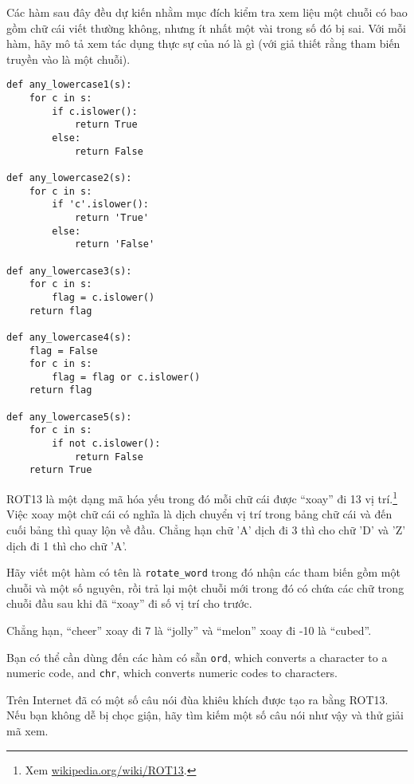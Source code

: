 \documentclass[11pt]{book}
\begin{document}
\begin{ex}
Các hàm sau đây đều dự kiến nhằm mục đích kiểm tra xem liệu một chuỗi
có bao gồm chữ cái viết thường không, nhưng ít nhất một vài trong số đó
bị sai. Với mỗi hàm, hãy mô tả xem tác dụng thực sự của nó là gì (với
giả thiết rằng tham biến truyền vào là một chuỗi).

\beforeverb
\begin{verbatim}
def any_lowercase1(s):
    for c in s:
        if c.islower():
            return True
        else:
            return False

def any_lowercase2(s):
    for c in s:
        if 'c'.islower():
            return 'True'
        else:
            return 'False'

def any_lowercase3(s):
    for c in s:
        flag = c.islower()
    return flag

def any_lowercase4(s):
    flag = False
    for c in s:
        flag = flag or c.islower()
    return flag

def any_lowercase5(s):
    for c in s:
        if not c.islower():
            return False
    return True
\end{verbatim}
\afterverb

\end{ex}


\begin{ex}

\label{exrotate}
ROT13 là một dạng mã hóa yếu trong đó mỗi chữ cái được ``xoay'' đi
13 vị trí.\footnote{Xem
  \url{wikipedia.org/wiki/ROT13}.} Việc xoay một chữ cái có nghĩa
là dịch chuyển vị trí trong bảng chữ cái và đến cuối bảng thì quay lộn
về đầu. Chẳng hạn chữ 'A' dịch đi 3 thì cho chữ 'D' và 'Z' dịch đi 1 thì
cho chữ 'A'.

Hãy viết một hàm có tên là \verb"rotate_word" trong đó nhận các
tham biến gồm một chuỗi và một số nguyên, rồi trả lại một chuỗi mới
trong đó có chứa các chữ trong chuỗi đầu sau khi đã ``xoay'' đi 
số vị trí cho trước.

Chẳng hạn, ``cheer'' xoay đi 7 là ``jolly'' và ``melon'' xoay đi
-10 là ``cubed''.  


Bạn có thể cần dùng đến các hàm có sẵn {\tt ord}, which converts
a character to a numeric code, and {\tt chr}, which converts numeric
codes to characters.

Trên Internet đã có một số câu nói đùa khiêu khích được tạo ra
bằng ROT13. Nếu bạn không dễ bị chọc giận, hãy tìm kiếm một số
câu nói như vậy và thử giải mã xem.
\end{ex}
\end{document}
